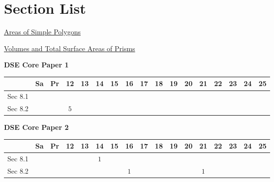 \documentclass[12pt, a4paper]{article}
\begin{document}
\section*{Section List}
\begin{enumx}[label=Sec 8.\arabic*\ ]
\item \hyperref[section:1-8-1]{Areas of Simple Polygons}
\item \hyperref[section:1-8-2]{Volumes and Total Surface Areas of Prisms}
\end{enumx}
\begin{absolutelynopagebreak}
\begin{center}
\textbf{DSE Core Paper 1}
\end{center}
\begin{center}
\begin{tabular}{|l|c|c|c|c|c|c|c|c|c|c|c|c|c|c|c|c|}
\hline
        & Sa & Pr & 12 & 13 & 14 & 15 & 16 & 17 & 18 & 19 & 20 & 21 & 22 & 23 & 24 & 25 \\\hline\hline
Sec 8.1 &  &  &  &  &  &  &  &  &  &  &  &  &  &  &  &  \\\hline
Sec 8.2 &  &  &  $5$ &  &  &  &  &  &  &  &  &  &  &  &  &  \\\hline
\end{tabular}
\end{center}
\end{absolutelynopagebreak}
\begin{absolutelynopagebreak}
\begin{center}
\textbf{DSE Core Paper 2}
\end{center}
\begin{center}
\begin{tabular}{|l|c|c|c|c|c|c|c|c|c|c|c|c|c|c|c|c|}
\hline
        & Sa & Pr & 12 & 13 & 14 & 15 & 16 & 17 & 18 & 19 & 20 & 21 & 22 & 23 & 24 & 25 \\\hline\hline
Sec 8.1 &  &  &  &  &  $1$ &  &  &  &  &  &  &  &  &  &  &  \\\hline
Sec 8.2 &  &  &  &  &  &  &  $1$ &  &  &  &  &  $1$ &  &  &  &  \\\hline
\end{tabular}
\end{center}
\end{absolutelynopagebreak}
\end{document}
